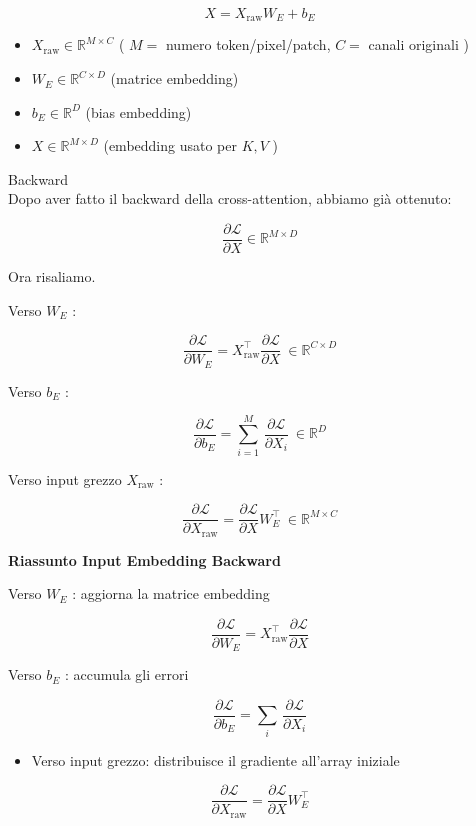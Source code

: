 \documentclass[
  11pt,
]{article}
\begin{document}
\[X = X_{\text{raw}}W_{E} + b_{E}\]

\begin{itemize}
\item
  \(X_{\text{raw}} \in \mathbb{R}^{M \times C}\) ( \(M =\) numero
  token/pixel/patch, \(C =\) canali originali )
\item
  \(W_{E} \in \mathbb{R}^{C \times D}\) (matrice embedding)
\item
  \(b_{E} \in \mathbb{R}^{D}\) (bias embedding)
\item
  \(X \in \mathbb{R}^{M \times D}\) (embedding usato per \(K,V\) )
\end{itemize}

Backward\\
Dopo aver fatto il backward della cross-attention, abbiamo già ottenuto:

\[\frac{\partial\mathcal{L}}{\partial X} \in \mathbb{R}^{M \times D}\]

Ora risaliamo.

Verso \(W_{E}\) :

\[\frac{\partial\mathcal{L}}{\partial W_{E}} = X_{\text{raw}}^{\top}\frac{\partial\mathcal{L}}{\partial X}\  \in \mathbb{R}^{C \times D}\]

Verso \(b_{E}\) :

\[\frac{\partial\mathcal{L}}{\partial b_{E}} = \sum_{i = 1}^{M}\,\frac{\partial\mathcal{L}}{\partial X_{i}}\  \in \mathbb{R}^{D}\]

Verso input grezzo \(X_{\text{raw}}\) :

\[\frac{\partial\mathcal{L}}{\partial X_{\text{raw}}} = \frac{\partial\mathcal{L}}{\partial X}W_{E}^{\top}\  \in \mathbb{R}^{M \times C}\]

\textbf{Riassunto Input Embedding Backward}

Verso \(W_{E}\) : aggiorna la matrice embedding

\[\frac{\partial\mathcal{L}}{\partial W_{E}} = X_{\text{raw}}^{\top}\frac{\partial\mathcal{L}}{\partial X}\]

Verso \(b_{E}\) : accumula gli errori

\[\frac{\partial\mathcal{L}}{\partial b_{E}} = \sum_{i}^{}\,\frac{\partial\mathcal{L}}{\partial X_{i}}\]

\begin{itemize}
\item
  Verso input grezzo: distribuisce il gradiente
  all'array iniziale
\end{itemize}

\[\frac{\partial\mathcal{L}}{\partial X_{\text{raw}}} = \frac{\partial\mathcal{L}}{\partial X}W_{E}^{\top}\]
\end{document}
